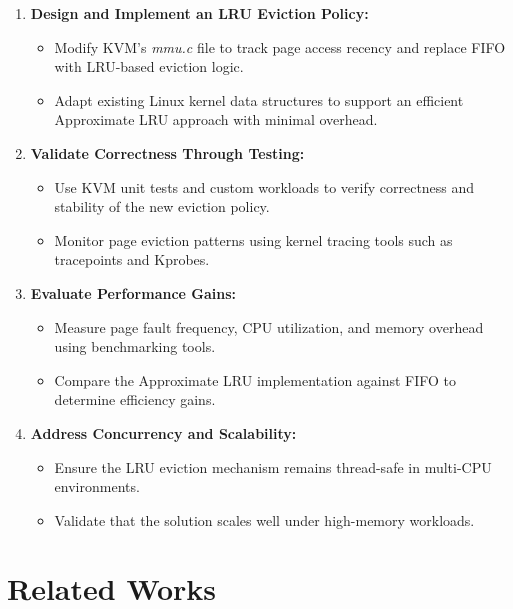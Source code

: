 \documentclass[letterpaper,twocolumn,10pt]{article}
\begin{document}
\begin{enumerate}[leftmargin=*,itemsep=2pt,topsep=2pt]
    \item \textbf{Design and Implement an LRU Eviction Policy:}
    \begin{itemize}[topsep=2pt,itemsep=1pt]
        \item Modify KVM's \textit{mmu.c} file to track page access recency and
              replace FIFO with LRU-based eviction logic.
        \item Adapt existing Linux kernel data structures to support an efficient
              Approximate LRU approach with minimal overhead.
    \end{itemize}

    \item \textbf{Validate Correctness Through Testing:}
    \begin{itemize}[topsep=2pt,itemsep=1pt]
        \item Use KVM unit tests and custom workloads to verify correctness and
              stability of the new eviction policy.
        \item Monitor page eviction patterns using kernel tracing tools such as
              tracepoints and Kprobes.
    \end{itemize}

    \item \textbf{Evaluate Performance Gains:}
    \begin{itemize}[topsep=2pt,itemsep=1pt]
        \item Measure page fault frequency, CPU utilization, and memory overhead
              using benchmarking tools.
        \item Compare the Approximate LRU implementation against FIFO to determine
              efficiency gains.
    \end{itemize}

    \item \textbf{Address Concurrency and Scalability:}
    \begin{itemize}[topsep=2pt,itemsep=1pt]
        \item Ensure the LRU eviction mechanism remains thread-safe in multi-CPU
              environments.
        \item Validate that the solution scales well under high-memory workloads.
    \end{itemize}
\end{enumerate}

\section{Related Works}
\end{document}
